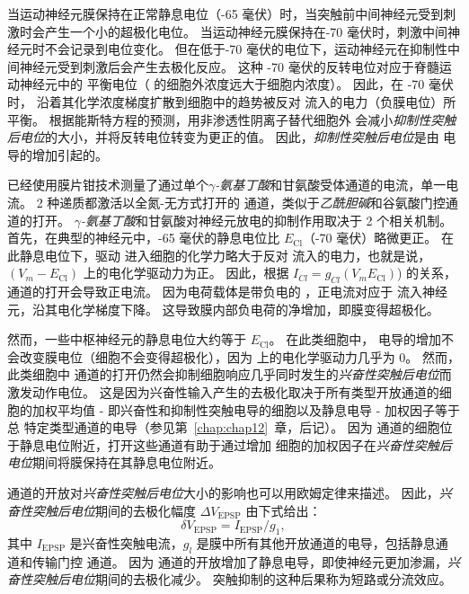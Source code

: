 当运动神经元膜保持在正常静息电位（-65 毫伏）时，当突触前中间神经元受到刺激时会产生一个小的超极化电位。
当运动神经元膜保持在-70 毫伏时，刺激中间神经元时不会记录到电位变化。
但在低于-70 毫伏的电位下，运动神经元在抑制性中间神经元受到刺激后会产生去极化反应。
这种 -70 毫伏的反转电位对应于脊髓运动神经元中的  平衡电位（ 的细胞外浓度远大于细胞内浓度）。
因此，在 -70 毫伏时， 沿着其化学浓度梯度扩散到细胞中的趋势被反对  流入的电力（负膜电位）所平衡。
根据能斯特方程的预测，用非渗透性阴离子替代细胞外  会减小\textit{抑制性突触后电位}的大小，并将反转电位转变为更正的值。
因此，\textit{抑制性突触后电位}是由  电导的增加引起的。


已经使用膜片钳技术测量了通过单个\textit{$\gamma$-氨基丁酸}和甘氨酸受体通道的电流，单一电流。
2 种递质都激活以全氮-无方式打开的  通道，类似于\textit{乙酰胆碱}和谷氨酸门控通道的打开。
\textit{$\gamma$-氨基丁酸}和甘氨酸对神经元放电的抑制作用取决于 2 个相关机制。
首先，在典型的神经元中，-65 毫伏的静息电位比 $E_\text{Cl}$（-70 毫伏）略微更正。
在此静息电位下，驱动  进入细胞的化学力略大于反对  流入的电力，也就是说， $(V_m - E_\text{Cl})$ 上的电化学驱动力为正。
因此，根据 $ I_{Cl} = g_{Cl} (V_m E_\text{Cl})$) 的关系， 通道的打开会导致正电流。 因为电荷载体是带负电的 ，正电流对应于  流入神经元，沿其电化学梯度下降。
这导致膜内部负电荷的净增加，即膜变得超极化。


然而，一些中枢神经元的静息电位大约等于 $E_\text{Cl}$。
在此类细胞中， 电导的增加不会改变膜电位（细胞不会变得超极化），因为  上的电化学驱动力几乎为 0。
然而，此类细胞中  通道的打开仍然会抑制细胞响应几乎同时发生的\textit{兴奋性突触后电位}而激发动作电位。
这是因为兴奋性输入产生的去极化取决于所有类型开放通道的细胞的加权平均值 - 即兴奋性和抑制性突触电导的细胞以及静息电导 - 加权因子等于总 特定类型通道的电导（参见第~\ref{chap:chap12}~章，后记）。
因为  通道的细胞位于静息电位附近，打开这些通道有助于通过增加  细胞的加权因子在\textit{兴奋性突触后电位}期间将膜保持在其静息电位附近。


 通道的开放对\textit{兴奋性突触后电位}大小的影响也可以用欧姆定律来描述。
因此，\textit{兴奋性突触后电位}期间的去极化幅度 $ \Delta V_{\text{EPSP}} $ 由下式给出：
\begin{equation}\label{depolarization_amplitude}
	\delta V_{\text{EPSP}} = I_{\text{EPSP}} / g_1,
\end{equation}
其中 $ I_{\text{EPSP}} $ 是兴奋性突触电流，$ g_l $ 是膜中所有其他开放通道的电导，包括静息通道和传输门控  通道。
因为  通道的开放增加了静息电导，即使神经元更加渗漏，\textit{兴奋性突触后电位}期间的去极化减少。
突触抑制的这种后果称为短路或分流效应。


